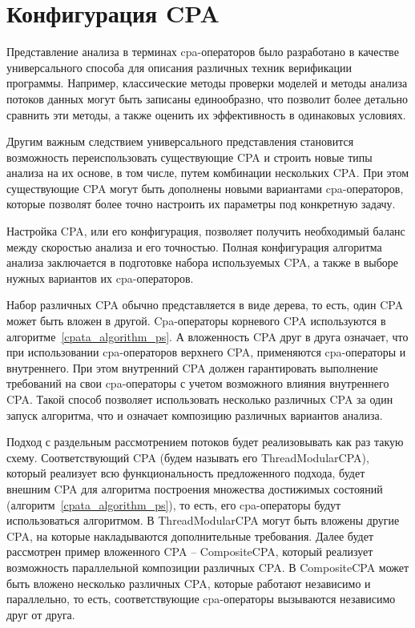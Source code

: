 \section{Конфигурация CPA}

Представление анализа в терминах cpa-операторов было разработано в качестве универсального способа для описания различных техник верификации программы.
Например, классические методы проверки моделей и методы анализа потоков данных могут быть записаны единообразно, что позволит более детально сравнить эти методы, а также оценить их эффективность в одинаковых условиях.

Другим важным следствием универсального представления становится возможность переиспользовать существующие CPA и строить новые типы анализа на их основе, в том числе, путем комбинации нескольких CPA.
При этом существующие CPA могут быть дополнены новыми вариантами cpa-операторов, которые позволят более точно настроить их параметры под конкретную задачу.

Настройка CPA, или его конфигурация, позволяет получить необходимый баланс между скоростью анализа и его точностью.
Полная конфигурация алгоритма анализа заключается в подготовке набора используемых CPA, а также в выборе нужных вариантов их cpa-операторов.

Набор различных CPA обычно представляется в виде дерева, то есть, один CPA может быть вложен в другой.
Cpa-операторы корневого CPA используются в алгоритме~\ref{cpata_algorithm_ps}.
А вложенность CPA друг в друга означает, что при использовании cpa-операторов верхнего CPA, применяются cpa-операторы и внутреннего.
При этом внутренний CPA должен гарантировать выполнение требований на свои cpa-операторы с учетом возможного влияния внутреннего CPA.
Такой способ позволяет использовать несколько различных CPA за один запуск алгоритма, что и означает композицию различных вариантов анализа.

Подход с раздельным рассмотрением потоков будет реализовывать как раз такую схему.
Соответствующий CPA (будем называть его ThreadModularCPA), который реализует всю функциональность предложенного подхода, будет внешним CPA для алгоритма построения множества достижимых состояний (алгоритм~\ref{cpata_algorithm_ps}), то есть, его cpa-операторы будут использоваться алгоритмом.
В ThreadModularCPA могут быть вложены другие CPA, на которые накладываются дополнительные требования.
Далее будет рассмотрен пример вложенного CPA -- CompositeCPA, который реализует возможность параллельной композиции различных CPA. 
В CompositeCPA может быть вложено несколько различных CPA, которые работают независимо и параллельно, то есть, соответствующие cpa-операторы вызываются независимо друг от друга.

